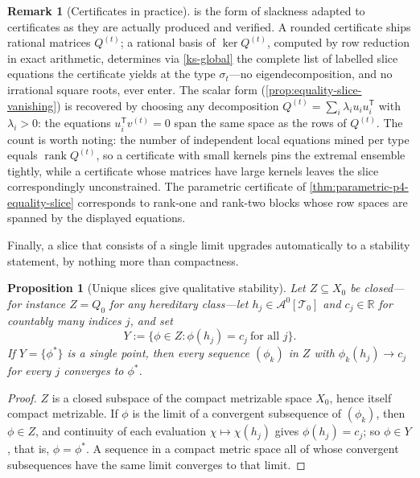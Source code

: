 \documentclass[11pt]{article}
\newtheorem{proposition}[proposition]{Proposition}
\theoremstyle{definition}
\newtheorem{remark}[remark]{Remark}
\newcommand{\R}{\mathbb{R}}
\newcommand{\A}{\mathcal{A}}
\newcommand{\T}{\mathcal{T}}
\begin{document}
\begin{remark}[Certificates in practice]\label{rem:kernel-practice}
 is the form of slackness adapted to certificates as they are
actually produced and verified.  A rounded certificate ships rational matrices
$Q^{(t)}$; a rational basis of $\ker Q^{(t)}$, computed by row reduction in exact
arithmetic, determines via \ref{ks-global} the complete list of labelled slice
equations the certificate yields at the type $\sigma_t$---no eigendecomposition, and no
irrational square roots, ever enter.  The scalar form (\cref{prop:equality-slice-vanishing})
is recovered by choosing any decomposition $Q^{(t)}=\sum_i\lambda_iu_iu_i^{\mathsf T}$
with $\lambda_i>0$: the equations $u_i^{\mathsf T}v^{(t)}=0$ span the same space as the
rows of $Q^{(t)}$.  The count is worth noting: the number of independent local equations
mined per type equals $\operatorname{rank}Q^{(t)}$, so a certificate with small kernels
pins the extremal ensemble tightly, while a certificate whose matrices have large
kernels leaves the slice correspondingly unconstrained.  The parametric certificate of
\cref{thm:parametric-p4-equality-slice} corresponds to rank-one and rank-two blocks
whose row spaces are spanned by the displayed equations.
\end{remark}

Finally, a slice that consists of a single limit upgrades automatically to a stability
statement, by nothing more than compactness.

\begin{proposition}[Unique slices give qualitative stability]\label{prop:unique-slice-stability}
Let $Z\subseteq X_0$ be closed---for instance $Z=Q_0$ for any hereditary class---let
$h_j\in\A^0[\T_0]$ and $c_j\in\R$ for countably many indices $j$, and set
\[
  Y:=\{\phi\in Z:\phi(h_j)=c_j\ \text{for all }j\}.
\]
If $Y=\{\phi^\ast\}$ is a single point, then every sequence $(\phi_k)$ in $Z$ with
$\phi_k(h_j)\to c_j$ for every $j$ converges to $\phi^\ast$.
\end{proposition}

\begin{proof}
$Z$ is a closed subspace of the compact metrizable space $X_0$, hence itself compact
metrizable.  If $\phi$ is the limit of a convergent subsequence of $(\phi_k)$, then
$\phi\in Z$, and continuity of each evaluation $\chi\mapsto\chi(h_j)$ gives
$\phi(h_j)=c_j$; so $\phi\in Y$, that is, $\phi=\phi^\ast$.  A sequence in a compact
metric space all of whose convergent subsequences have the same limit converges to that
limit.
\end{proof}
\end{document}
